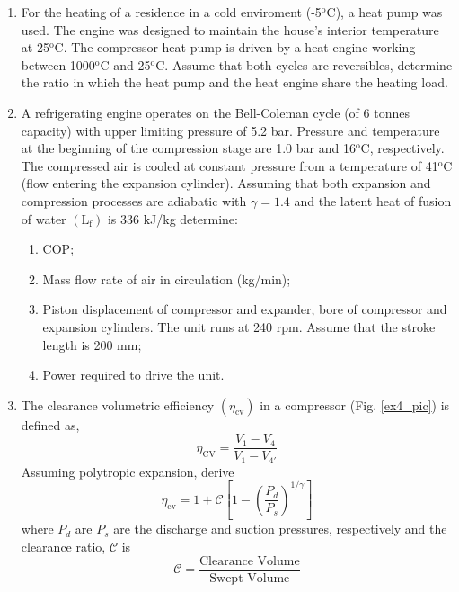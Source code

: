 \documentclass[12pts,a4paper,amsmath,amssymb,floatfix]{article}%
\newcommand{\frc}{\displaystyle\frac}
\begin{document}
\begin{enumerate}[label=\bfseries Problem \arabic*]

\item For the heating of a residence in a cold enviroment (-5$^{\text{o}}$C), a heat pump was used. The engine was designed to maintain the house's interior temperature at 25$^{\text{o}}$C. The compressor heat pump is driven by a heat engine working between 1000$^{\text{o}}$C and 25$^{\text{o}}$C. Assume that both cycles are reversibles, determine the ratio in which the heat pump and the heat engine share the heating load.

\item A refrigerating engine operates on the Bell-Coleman cycle (of 6 tonnes capacity) with upper limiting pressure of 5.2 bar. Pressure and temperature at the beginning of the compression stage are 1.0 bar and 16$^{\text{o}}$C, respectively. The compressed air is cooled at constant pressure from a temperature of 41$^{\text{o}}$C  (flow entering the expansion cylinder). Assuming that both expansion and compression processes are adiabatic with $\gamma=1.4$ and the latent heat of fusion of water $\left(\text{L}_{\text{f}}\right)$ is 336 kJ/kg determine:

\begin{enumerate}
\item COP;
\item Mass flow rate of air in circulation (kg/min);
\item Piston displacement of compressor and expander, bore of compressor and expansion cylinders. The unit runs at 240 rpm. Assume that the stroke length is 200 mm;
\item Power required to drive the unit.
\end{enumerate}

\item \label{Ex4} The clearance volumetric efficiency $\left(\eta_{\text{cv}}\right)$ in a compressor (Fig. \ref{ex4_pic}) is defined as,
\begin{displaymath}
\eta_{\text{CV}} = \frc{V_{1}-V_{4}}{V_{1}-V_{4'}}
\end{displaymath}
Assuming polytropic expansion, derive
\begin{displaymath}
\eta_{\text{cv}} = 1 + \mathcal{C}\left[1-\left(\frc{P_{d}}{P_{s}}\right)^{1/\gamma}\right]
\end{displaymath}
where $P_{d}$ are $P_{s}$ are the discharge and suction pressures, respectively and the clearance ratio, $\mathcal{C}$ is
\begin{displaymath}
\mathcal{C}=\frc{\text{Clearance Volume}}{\text{Swept Volume}} 
\end{displaymath}


\end{enumerate}
\end{document}
